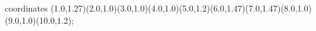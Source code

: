					coordinates { (1.0,1.27)(2.0,1.0)(3.0,1.0)(4.0,1.0)(5.0,1.2)(6.0,1.47)(7.0,1.47)(8.0,1.0)(9.0,1.0)(10.0,1.2)};
